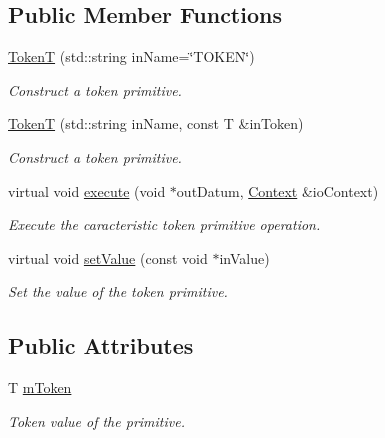 \subsection*{Public Member Functions}
\begin{DoxyCompactItemize}
\item 
\hyperlink{classPuppy_1_1TokenT_a6a7b7bfc007d988e971e27bd1dec45ef}{Token\+T} (std\+::string in\+Name=\char`\"{}T\+O\+K\+E\+N\char`\"{})
\begin{DoxyCompactList}\small\item\em Construct a token primitive. \end{DoxyCompactList}\item 
\hyperlink{classPuppy_1_1TokenT_a459a16b36d08f3d4fddd41f720bdd7e2}{Token\+T} (std\+::string in\+Name, const T \&in\+Token)
\begin{DoxyCompactList}\small\item\em Construct a token primitive. \end{DoxyCompactList}\item 
virtual void \hyperlink{classPuppy_1_1TokenT_a15641f373da2d98c057247c32deb943a}{execute} (void $\ast$out\+Datum, \hyperlink{classPuppy_1_1Context}{Context} \&io\+Context)
\begin{DoxyCompactList}\small\item\em Execute the caracteristic token primitive operation. \end{DoxyCompactList}\item 
virtual void \hyperlink{classPuppy_1_1TokenT_ad38ced7ce46e1ef1449bd90560296f3f}{set\+Value} (const void $\ast$in\+Value)
\begin{DoxyCompactList}\small\item\em Set the value of the token primitive. \end{DoxyCompactList}\end{DoxyCompactItemize}
\subsection*{Public Attributes}
\begin{DoxyCompactItemize}
\item 
\hypertarget{classPuppy_1_1TokenT_abb63e082387b0aa4f8986ae52f020020}{}T \hyperlink{classPuppy_1_1TokenT_abb63e082387b0aa4f8986ae52f020020}{m\+Token}\label{classPuppy_1_1TokenT_abb63e082387b0aa4f8986ae52f020020}

\begin{DoxyCompactList}\small\item\em Token value of the primitive. \end{DoxyCompactList}\end{DoxyCompactItemize}
